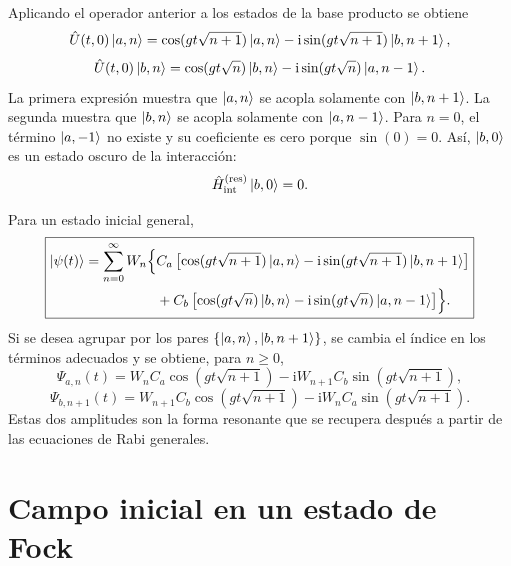 \documentclass[11pt]{article}
\newcommand{\ii}{\mathrm{i}}
\newcommand{\Hint}{\hat H_{\mathrm{int}}}
\begin{document}
Aplicando el operador anterior a los estados de la base producto se obtiene
\begin{equation}
  \hat U(t,0)\ket{a,n}
  =
  \cos(gt\sqrt{n+1})\ket{a,n}
  -
  \ii\sin(gt\sqrt{n+1})\ket{b,n+1},
\end{equation}
\begin{equation}
  \hat U(t,0)\ket{b,n}
  =
  \cos(gt\sqrt n)\ket{b,n}
  -
  \ii\sin(gt\sqrt n)\ket{a,n-1}.
\end{equation}
La primera expresi\'on muestra que $\ket{a,n}$ se acopla solamente con
$\ket{b,n+1}$. La segunda muestra que $\ket{b,n}$ se acopla solamente con
$\ket{a,n-1}$. Para $n=0$, el t\'ermino $\ket{a,-1}$ no existe y su coeficiente
es cero porque $\sin(0)=0$. As\'i, $\ket{b,0}$ es un estado oscuro de la
interacci\'on:
\begin{equation}
  \Hint^{(\mathrm{res})}\ket{b,0}=0.
\end{equation}

Para un estado inicial general,
\begin{align}
  \boxed{
  \begin{aligned}
  \ket{\psi(t)}
  =
  \sum_{n=0}^{\infty}W_n
  \Bigl\{
  &C_a
  \left[
  \cos(gt\sqrt{n+1})\ket{a,n}
  -
  \ii\sin(gt\sqrt{n+1})\ket{b,n+1}
  \right]\notag\\
  &+
  C_b
  \left[
  \cos(gt\sqrt n)\ket{b,n}
  -
  \ii\sin(gt\sqrt n)\ket{a,n-1}
  \right]
  \Bigr\}.
  \end{aligned}
  }
\end{align}
Si se desea agrupar por los pares $\{\ket{a,n},\ket{b,n+1}\}$, se cambia el
\'indice en los t\'erminos adecuados y se obtiene, para $n\geq 0$,
\begin{equation}
  \Psi_{a,n}(t)
  =
  W_n C_a\cos(gt\sqrt{n+1})
  -
  \ii W_{n+1}C_b\sin(gt\sqrt{n+1}),
\end{equation}
\begin{equation}
  \Psi_{b,n+1}(t)
  =
  W_{n+1}C_b\cos(gt\sqrt{n+1})
  -
  \ii W_n C_a\sin(gt\sqrt{n+1}).
\end{equation}
Estas dos amplitudes son la forma resonante que se recupera despu\'es a partir
de las ecuaciones de Rabi generales.

\section{Campo inicial en un estado de Fock}
\end{document}
